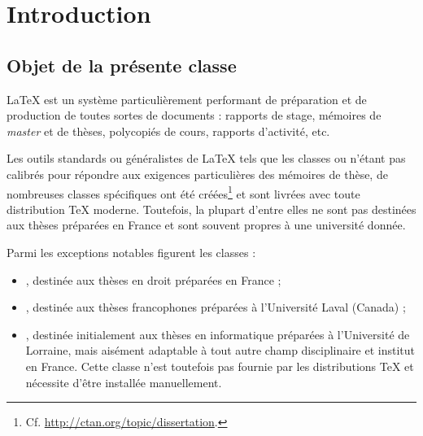 \chapter{Introduction}

\section{Objet de la présente classe}
\label{sec-objet-de-la}

\LaTeX{} est un système particulièrement performant de préparation et de
production de toutes sortes de documents : rapports de stage, mémoires de
\emph{master} et de thèses, polycopiés de cours, rapports d'activité, etc.

Les outils standards ou généralistes de \LaTeX{} tels que les classes
 ou  n'étant pas calibrés pour répondre aux exigences
particulières des mémoires de thèse, de nombreuses classes spécifiques ont été
créées\footnote{Cf. \url{http://ctan.org/topic/dissertation}.}  et sont livrées
avec toute distribution \TeX{} moderne. Toutefois, la plupart d'entre elles ne
sont pas destinées aux thèses préparées en France et sont souvent propres à une
université donnée.

Parmi les exceptions notables figurent les classes :
\begin{itemize}
\item {}, destinée aux thèses en droit préparées en France ;
\item {}, destinée aux thèses francophones préparées
  à l'Université Laval (Canada) ;
\item {}, destinée
  initialement aux thèses en informatique préparées à l'Université de Lorraine,
  mais aisément adaptable à tout autre champ disciplinaire et institut en
  France. Cette classe n'est toutefois pas fournie par les distributions \TeX{}
  et nécessite d'être installée manuellement.
\end{itemize}

\frenchabstract{}


